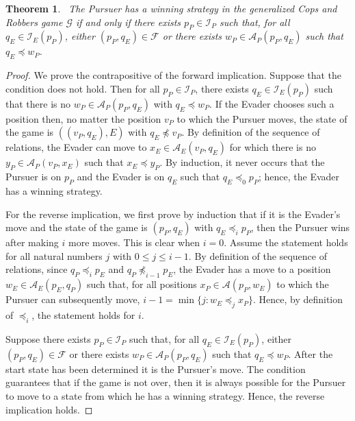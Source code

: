 \documentclass[12pt,reqno]{amsart}
\newtheorem{theorem}{Theorem}
\begin{document}
\smallskip
\begin{theorem}~\label{main1}
The Pursuer has a winning strategy in the generalized Cops and Robbers game $\mathcal{G}$ if and only if there exists $p_P \in \mathcal{I}_P$ such that, for all $q_E \in \mathcal{I}_E(p_P)$, either
$(p_P, q_E) \in \mathcal{F}$ or there exists $w_P \in \mathcal{A}_P(p_P, q_E)$ such that $q_E \preceq w_P$.
\end{theorem}
\begin{proof}
We prove the contrapositive of the forward implication. Suppose that the condition does not hold.  Then for all $p_P \in \mathcal{I}_P$, there exists $q_E \in \mathcal{I}_E(p_P)$ such that there is
no $w_P \in \mathcal{A}_P(p_P, q_E)$ with $q_E \preceq w_P$. If the Evader chooses such a position then, no matter the position $v_P$ to which the Pursuer moves, the state of the game is $((v_P,
q_E), E)$ with $q_E \not\preceq v_P$. By definition of the sequence of relations, the Evader can move to $x_E \in \mathcal{A}_E(v_P, q_E)$ for which there is no $y_P \in \mathcal{A}_P(v_P,x_E)$ such
that $x_E \preceq y_P$.  By induction, it never occurs that the Pursuer is on $p_P$ and the Evader is on $q_E$ such that $q_E \preceq _0 p_P$; hence, the Evader has a winning strategy.

For the reverse implication, we first prove by induction that if it is the Evader's move and the state of the game is $(p_P, q_E)$ with $q_E \preceq_i p_P$, then the Pursuer wins after making $i$
more moves.  This is clear when $i = 0$.  Assume the statement holds for all natural numbers $j$ with $0 \leq j \leq i-1$.  By definition of the sequence of relations, since $q_P \preceq_i p_E$ and
$q_P \not\preceq_{i-1} p_E$, the Evader has a move to a position $w_E \in \mathcal{A}_E(p_E, q_P)$ such that, for all positions $x_P \in \mathcal{A}(p_P, w_E)$ to which the Pursuer can subsequently
move, $i-1 = \min \{j: w_E \preceq_j x_P\}$. Hence, by definition of $\preceq_i$, the statement holds for $i.$

Suppose there exists $p_P \in \mathcal{I}_P$ such that, for all $q_E \in \mathcal{I}_E(p_P)$, either $(p_P, q_E) \in \mathcal{F}$ or there exists $w_P \in \mathcal{A}_P(p_P, q_E)$ such that $q_E
\preceq w_P$.  After the start state has been determined it is the Pursuer's move.  The condition guarantees that if the game is not over, then it is always possible for the Pursuer to move to a
state from which he has a winning strategy.   Hence, the reverse implication holds.
\end{proof}
\end{document}
